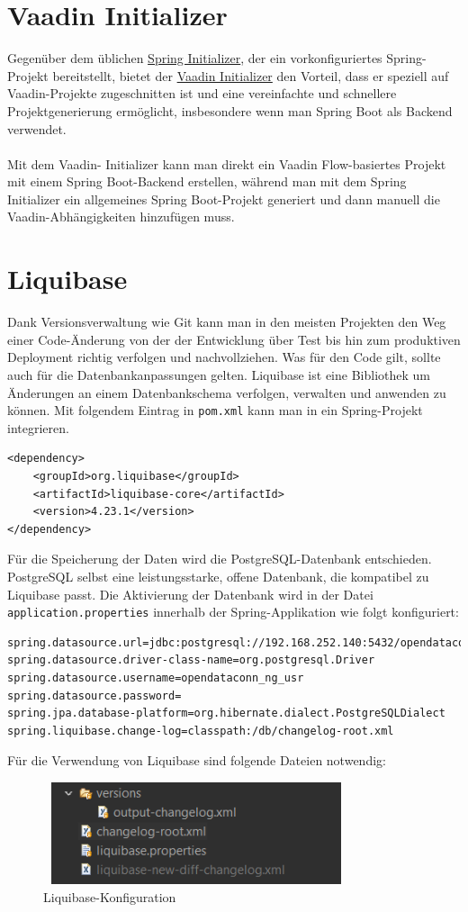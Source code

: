 \documentclass[a4paper,12pt]{scrreprt}
\begin{document}
\section{Vaadin Initializer}
Gegenüber dem üblichen \href{https://start.spring.io/} {Spring Initializer}, der ein vorkonfiguriertes Spring-Projekt bereitstellt, bietet der \href{https://start.vaadin.com/app/p} {Vaadin Initializer} den Vorteil, dass er speziell auf Vaadin-Projekte zugeschnitten ist und eine vereinfachte und schnellere Projektgenerierung ermöglicht, insbesondere wenn man Spring Boot als Backend verwendet.\\ \\ Mit dem Vaadin- Initializer kann man direkt ein Vaadin Flow-basiertes Projekt mit einem Spring Boot-Backend erstellen, während man mit dem Spring Initializer ein allgemeines Spring Boot-Projekt generiert und dann manuell die Vaadin-Abhängigkeiten hinzufügen muss.

\section{Liquibase}
Dank Versionsverwaltung wie Git kann man in den meisten Projekten den Weg einer Code-Änderung von der der Entwicklung über Test bis hin zum produktiven Deployment richtig verfolgen und nachvollziehen. Was für den Code gilt, sollte auch für die Datenbankanpassungen gelten. Liquibase ist eine Bibliothek um Änderungen an einem Datenbankschema verfolgen, verwalten und anwenden zu können. Mit folgendem Eintrag in \texttt{pom.xml} kann man in ein Spring-Projekt integrieren.
\begin{lstlisting}[language=POM]
<dependency>
    <groupId>org.liquibase</groupId>
    <artifactId>liquibase-core</artifactId>
    <version>4.23.1</version>
</dependency>
\end{lstlisting}
Für die Speicherung der Daten wird die PostgreSQL-Datenbank entschieden. PostgreSQL selbst eine leistungsstarke, offene Datenbank, die kompatibel zu Liquibase passt. Die Aktivierung der Datenbank wird in der Datei \texttt{application.properties} innerhalb der Spring-Applikation wie folgt konfiguriert:
\begin{lstlisting}[language=properties]
spring.datasource.url=jdbc:postgresql://192.168.252.140:5432/opendataconn_ng
spring.datasource.driver-class-name=org.postgresql.Driver
spring.datasource.username=opendataconn_ng_usr
spring.datasource.password=
spring.jpa.database-platform=org.hibernate.dialect.PostgreSQLDialect
spring.liquibase.change-log=classpath:/db/changelog-root.xml
\end{lstlisting}
Für die Verwendung von Liquibase sind folgende Dateien notwendig:
\begin{figure}[h!]
\centering
\includegraphics[width=9cm, height=3cm]{liquibase-changelog.png}
\caption{\label{datenbank:konfiguration} Liquibase-Konfiguration}
\end{figure}
\end{document}

